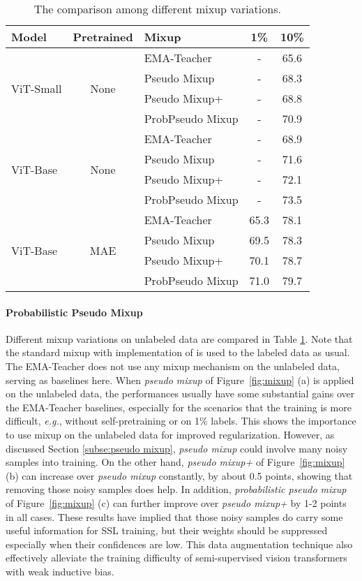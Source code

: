 \documentclass{article}
\newcommand\eg{\emph{e.g.}}
\begin{document}
\setlength{\tabcolsep}{8pt}
\begin{table}[t]
\begin{center}
\small
\begin{tabular}{lclcc}
\toprule
Model &Pretrained &Mixup & 1\% & 10\% \\\hline
\multirow{4}{*}{ViT-Small} &\multirow{4}{*}{None} &EMA-Teacher &- &65.6 \\
& &Pseudo Mixup &- &68.3 \\
& &Pseudo Mixup+ &- &68.8 \\
& &ProbPseudo Mixup &- &70.9 \\\hline
\multirow{4}{*}{ViT-Base} &\multirow{4}{*}{None} &EMA-Teacher &- &68.9 \\
& &Pseudo Mixup &- &71.6 \\
& &Pseudo Mixup+ &- &72.1 \\
& &ProbPseudo Mixup &- &73.5 \\\hline
\multirow{4}{*}{ViT-Base} &\multirow{4}{*}{MAE} &EMA-Teacher &65.3 &78.1 \\
& &Pseudo Mixup &69.5 &78.3 \\
& &Pseudo Mixup+ &70.1 &78.7 \\
& &ProbPseudo Mixup &71.0 &79.7 \\
\bottomrule
\end{tabular}
\caption{The comparison among different mixup variations.
}
\label{tab:mixup}
\end{center}\vspace{-3mm}
\end{table}


\paragraph{Probabilistic Pseudo Mixup} Different mixup variations on unlabeled data are compared in Table \ref{tab:mixup}. Note that the standard mixup with implementation of \cite{rw2019timm} is used to the labeled data as usual. The EMA-Teacher does not use any mixup mechanism on the unlabeled data, serving as baselines here. When \emph{pseudo mixup} of Figure~\ref{fig:mixup} (a) is applied on the unlabeled data, the performances usually have some substantial gains over the EMA-Teacher baselines, especially for the scenarios that the training is more difficult, \eg, without self-pretraining or on 1\% labels. This shows the importance to use mixup on the unlabeled data for improved regularization. However, as discussed Section \ref{subse:pseudo mixup}, \emph{pseudo mixup} could involve many noisy samples into training. On the other hand, \emph{pseudo mixup+} of Figure~\ref{fig:mixup} (b) can increase over \emph{pseudo mixup} constantly, by about 0.5 points, showing that removing those noisy samples does help. In addition, \emph{probabilistic pseudo mixup} of Figure~\ref{fig:mixup} (c) can further improve over \emph{pseudo mixup+} by 1-2 points in all cases. These results have implied that those noisy samples do carry some useful information for SSL training, but their weights should be suppressed especially when their confidences are low. This data augmentation technique also effectively alleviate the training difficulty of semi-supervised vision transformers with weak inductive bias.
\end{document}
